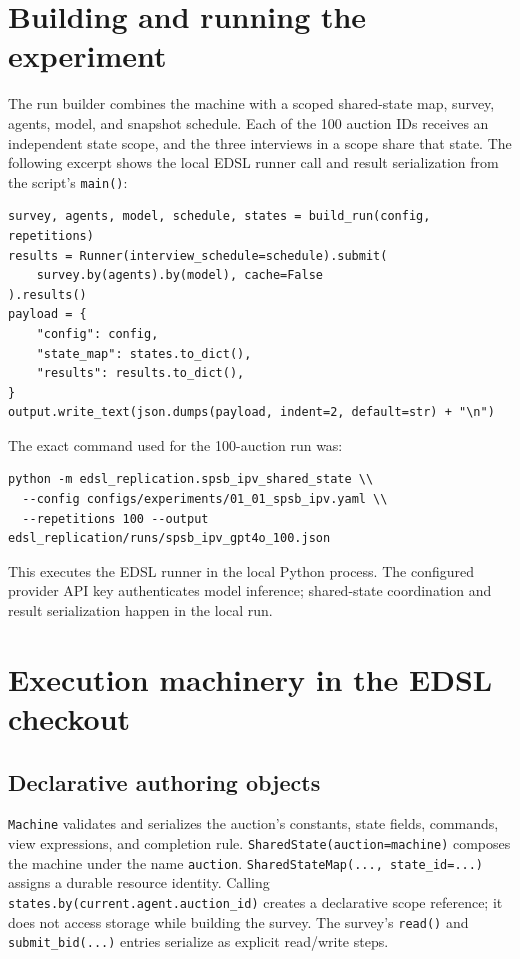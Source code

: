 \documentclass[11pt]{article}
\begin{document}
\section{Building and running the experiment}

The run builder combines the machine with a scoped shared-state map, survey, agents, model, and snapshot schedule. Each of the 100 auction IDs receives an independent state scope, and the three interviews in a scope share that state. The following excerpt shows the local EDSL runner call and result serialization from the script's \texttt{main()}:

\begin{lstlisting}[style=python]
survey, agents, model, schedule, states = build_run(config, repetitions)
results = Runner(interview_schedule=schedule).submit(
    survey.by(agents).by(model), cache=False
).results()
payload = {
    "config": config,
    "state_map": states.to_dict(),
    "results": results.to_dict(),
}
output.write_text(json.dumps(payload, indent=2, default=str) + "\n")
\end{lstlisting}

The exact command used for the 100-auction run was:
\begin{lstlisting}
python -m edsl_replication.spsb_ipv_shared_state \\
  --config configs/experiments/01_01_spsb_ipv.yaml \\
  --repetitions 100 --output edsl_replication/runs/spsb_ipv_gpt4o_100.json
\end{lstlisting}

This executes the EDSL runner in the local Python process. The configured provider API key authenticates model inference; shared-state coordination and result serialization happen in the local run.

\section{Execution machinery in the EDSL checkout}

\subsection{Declarative authoring objects}

\texttt{Machine} validates and serializes the auction's constants, state fields, commands, view expressions, and completion rule. \texttt{SharedState(auction=machine)} composes the machine under the name \texttt{auction}. \texttt{SharedStateMap(..., state\_id=...)} assigns a durable resource identity. Calling \texttt{states.by(current.agent.auction\_id)} creates a declarative scope reference; it does not access storage while building the survey. The survey's \texttt{read()} and \texttt{submit\_bid(...)} entries serialize as explicit read/write steps.
\end{document}
